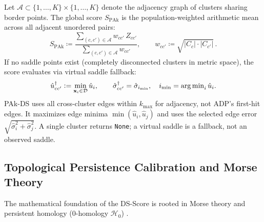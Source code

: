 \begin{definition}
  \label{def:global_ds_score}
  Let $\mathcal{A} \subset \{1, \dots, K\} \times \{1, \dots, K\}$
  denote the adjacency graph of clusters sharing border points. The
  global score $S_{\mathrm{PAk}}$ is the population-weighted
  arithmetic mean across all adjacent unordered pairs:
  \begin{equation}
    S_{\mathrm{PAk}} \coloneqq \frac{\sum_{(c, c') \in \mathcal{A}}
    w_{cc'} \, Z_{cc'}}{\sum_{(c, c') \in \mathcal{A}} w_{cc'}},
    \qquad w_{cc'} \coloneqq \sqrt{|C_c| \cdot |C_{c'}|}\,.
    \label{eq:global_pak_ds_score}
  \end{equation}
  If no saddle points exist (completely disconnected clusters in
  metric space), the score evaluates via virtual saddle fallback:
  \begin{equation}
    \hat{u}_{cc'}^\dagger \mathrel{\mathop:}= \min_{\mathbf{x}_i \in \mathcal{D}}
    \hat{u}_i, \qquad \hat{\sigma}_{cc'}^\dagger=\hat\sigma_{i_{\min}},
    \quad i_{\min}=\operatorname{arg\,min}_i\hat u_i.
    \label{eq:virtual_saddle}
  \end{equation}
  PAk-DS uses all cross-cluster edges within $k_{\max}$ for adjacency,
  not ADP's first-hit edges. It maximizes edge minima
  $\min(\hat u_i,\hat u_j)$ and uses the selected edge error
  $\sqrt{\hat\sigma_i^2+\hat\sigma_j^2}$. A single cluster returns
  \texttt{None}; a virtual saddle is a fallback, not an observed saddle.
\end{definition}

\subsection{Topological Persistence Calibration and Morse Theory}
\label{subsec:topological_persistence}

The mathematical foundation of the DS-Score is rooted in Morse
theory and persistent homology (0-homology $\mathcal{H}_0$)
\parencite{edelsbrunner2002,chazal2013}.

